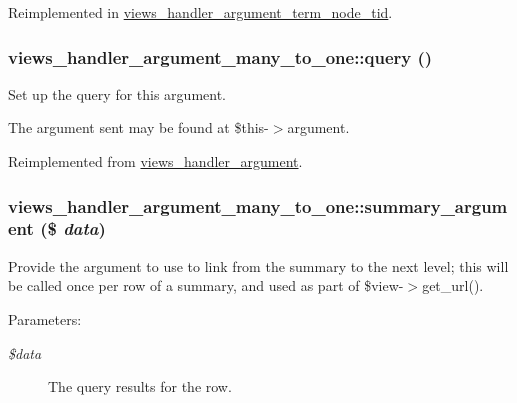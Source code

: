 Reimplemented in \hyperlink{classviews__handler__argument__term__node__tid_f00552a1378333434154989c051d0e98}{views\_\-handler\_\-argument\_\-term\_\-node\_\-tid}.\hypertarget{classviews__handler__argument__many__to__one_5386934f090273137694ea9d1de32d04}{
\subsubsection[{query}]{\setlength{\rightskip}{0pt plus 5cm}views\_\-handler\_\-argument\_\-many\_\-to\_\-one::query ()}}
\label{classviews__handler__argument__many__to__one_5386934f090273137694ea9d1de32d04}


Set up the query for this argument.

The argument sent may be found at \$this-$>$argument. 

Reimplemented from \hyperlink{classviews__handler__argument_c4b0ce6704a10f515b2aea2f9e790994}{views\_\-handler\_\-argument}.\hypertarget{classviews__handler__argument__many__to__one_94fb0499ff1078d0423de06d33e898a5}{
\subsubsection[{summary\_\-argument}]{\setlength{\rightskip}{0pt plus 5cm}views\_\-handler\_\-argument\_\-many\_\-to\_\-one::summary\_\-argument (\$ {\em data})}}
\label{classviews__handler__argument__many__to__one_94fb0499ff1078d0423de06d33e898a5}


Provide the argument to use to link from the summary to the next level; this will be called once per row of a summary, and used as part of \$view-$>$get\_\-url().

\begin{Desc}
\item[Parameters:]
\begin{description}
\item[{\em \$data}]The query results for the row. \end{description}
\end{Desc}


